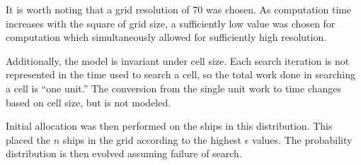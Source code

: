 \documentclass[a4paper]{article}
\begin{document}
It is worth noting that a grid resolution of 70 was chosen. As computation time increases with the square of grid size, a sufficiently low value was chosen for computation which simultaneously allowed for sufficiently high resolution. 

Additionally, the model is invariant under cell size. Each search iteration is not represented in the time used to search a cell, so the total work done in searching a cell is ``one unit.'' The conversion from the single unit work to time changes based on cell size, but is not modeled.

Initial allocation was then performed on the ships in this distribution. This placed the $n$ ships in the grid according to the highest $\epsilon$ values. The probability distribution is then evolved assuming failure of search.
\end{document}
